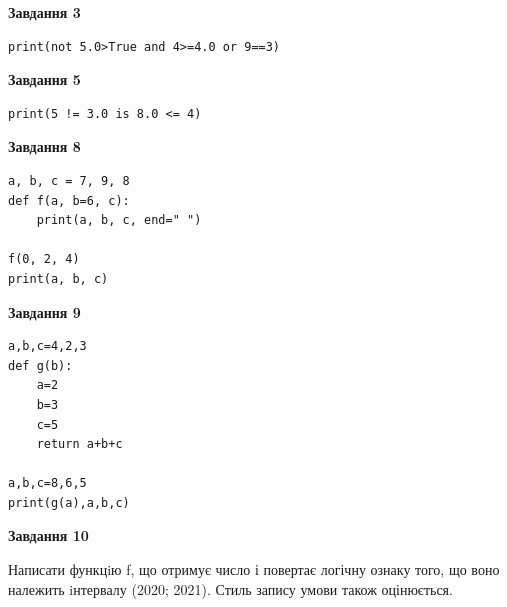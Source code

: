 \documentclass[12pt, ukrainian]{article}
\begin{document}
{\begin {large}
\begin{minipage}[t]{7.5cm}
\end{minipage}
\vline \hspace{6mm}
\begin{minipage}[t]{10.5cm}

\begin{center}
\textbf{Завдання 3}
\end{center}

\begin{verbatim}
print(not 5.0>True and 4>=4.0 or 9==3)
\end{verbatim}



\begin{center}
\textbf{Завдання 5}
\end{center}

\begin{verbatim}
print(5 != 3.0 is 8.0 <= 4)
\end{verbatim}



\begin{center}
\textbf{Завдання 8}
\end{center}

\begin{verbatim}
a, b, c = 7, 9, 8
def f(a, b=6, c):
    print(a, b, c, end=" ")

f(0, 2, 4)
print(a, b, c)
\end{verbatim}



\begin{center}
\textbf{Завдання 9}
\end{center}

\begin{verbatim}
a,b,c=4,2,3
def g(b):
    a=2
    b=3
    c=5
    return a+b+c

a,b,c=8,6,5
print(g(a),a,b,c)
\end{verbatim}



\begin{center}
\textbf{Завдання 10}
\end{center}

Написати функцiю f, що отримує число і повертає логічну ознаку того, що воно належить iнтервалу (2020; 2021). Стиль запису умови також оцінюється.\par

\end{minipage}

\end {large}}
\newpage
\end{document}
